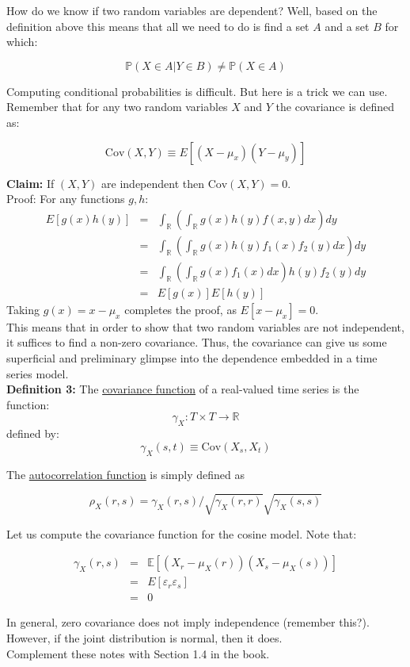 \documentclass[12] {article}
\begin{document}
How do we know if two random variables are dependent? Well, based on the definition above this means that all we need to do is find a set $A$ and a set $B$ for which:

\[ \mathbb{P}(X \in A | Y \in B) \neq \mathbb{P}(X \in A) \]

Computing conditional probabilities is difficult. But here is a trick we can use. Remember that for any two random variables $X$ and $Y$ the covariance is defined as:

\[ \textrm{Cov}(X,Y) \equiv E [ (X-\mu_x)(Y-\mu_y) ]  \]


\noindent \textbf{Claim:} If $(X, Y)$ are independent then $\textrm{Cov}(X,Y)=0$.  \\


\noindent Proof: For any functions $g,h$:\\
\begin{eqnarray*}
E[ g(x) h(y) ] &=& \int_{\mathbb{R}} \left( \int_{\mathbb{R}} g(x) h(y) f(x,y) dx \right) dy \\
&=& \int_{\mathbb{R}} \left( \int_{\mathbb{R}} g(x) h(y) f_1(x) f_{2}(y) dx \right) dy \\
&=& \int_{\mathbb{R}} \left( \int_{\mathbb{R}} g(x)  f_1(x)  dx \right) h(y) f_{2}(y) dy \\
&=& E[ g(x) ] E[h(y)]
\end{eqnarray*}
Taking $g(x)=x -\mu_x$ completes the proof, as $E[x-\mu_x]=0$.  \\


This means that in order to show that two random variables are not independent, it suffices to find a non-zero covariance. Thus, the covariance can give us some superficial and preliminary glimpse into the dependence embedded in a time series model.  \\

\noindent \textbf{Definition 3:} The \underline{covariance function} of a real-valued time series is the function:
\[ \gamma_{X}: T \times T \rightarrow \mathbb{R} \]
defined by:
\[ \gamma_{X}(s,t) \equiv \textrm{Cov} ( X_s, X_t )\] 

\noindent The \underline{autocorrelation function} is simply defined as

\[  \rho_{X}(r,s) = \gamma_X(r,s) / \sqrt{\gamma_{X}(r,r)} \sqrt{\gamma_{X}(s,s)}   \]

Let us compute the covariance function for the cosine model. Note that:

\begin{eqnarray*}
\gamma_{X} (r,s) &=& \mathbb{E}  [ (X_r - \mu_X(r)) (X_s - \mu_X(s))    ]   \\
&=& E [ \varepsilon_{r} \varepsilon_s ] \\
&=& 0
\end{eqnarray*}

In general, zero covariance does not imply independence (remember this?). However, if the joint distribution is normal, then it does. \\

Complement these notes with Section 1.4 in the book. 
\end{document}

